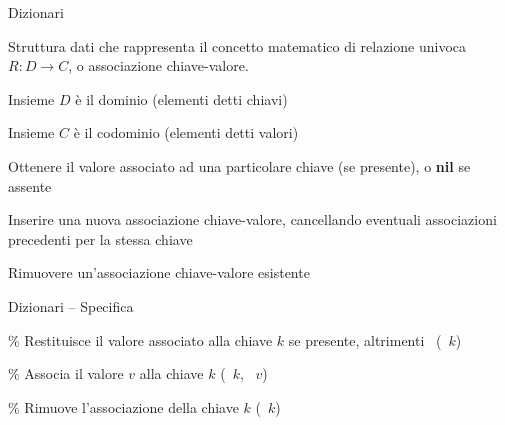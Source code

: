 \begin{frame}{Dizionari}
  
\begin{myboxtitle}[Dizionario]
Struttura dati che rappresenta il concetto matematico di \alert{relazione univoca}
$R: D \rightarrow C$, o associazione chiave-valore.
\BI
\item Insieme $D$ è il \alert{dominio} (elementi detti \alert{chiavi})
\item Insieme $C$ è il \alert{codominio} (elementi detti \alert{valori})
\EI
\end{myboxtitle}
  
\begin{myboxtitle}
\BI
\item Ottenere il valore associato ad una particolare chiave (se presente), o \textbf{nil} se assente
\item Inserire una nuova associazione chiave-valore, cancellando eventuali associazioni precedenti per la stessa chiave 
\item Rimuovere un'associazione chiave-valore esistente  
\EI
\end{myboxtitle}

\end{frame}

\begin{frame}{Dizionari -- Specifica}
  
\begin{Procedure}
\caption[A]{\Dictionary}
\BlankLine

\% Restituisce il valore associato alla chiave $k$ se presente, \Nil altrimenti\;
\alert{\Item\ \dictlookup(\Item\ $k$)\;}
\BlankLine

\% Associa il valore $v$ alla chiave $k$\;
\alert{\setinsert(\Item\ $k$, \Item\ $v$)\;}
\BlankLine

\% Rimuove l'associazione della chiave $k$\;
\alert{\setremove(\Item\ $k$)\;}
\end{Procedure}
  
  
\end{frame}


